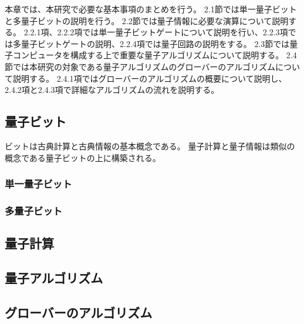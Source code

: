 \begin{comment}
    基本的内容
\end{comment}
本章では、本研究で必要な基本事項のまとめを行う。
2.1節では単一量子ビットと多量子ビットの説明を行う。
2.2節では量子情報に必要な演算について説明する。
2.2.1項、2.2.2項では単一量子ビットゲートについて説明を行い、2.2.3項では多量子ビットゲートの説明、2.2.4項では量子回路の説明をする。
2.3節では量子コンピュータを構成する上で重要な量子アルゴリズムについて説明する。
2.4節では本研究の対象である量子アルゴリズムのグローバーのアルゴリズムについて説明する。
2.4.1項ではグローバーのアルゴリズムの概要について説明し、2.4.2項と2.4.3項で詳細なアルゴリズムの流れを説明する。

\subsection{量子ビット}
ビットは古典計算と古典情報の基本概念である。
量子計算と量子情報は類似の概念である量子ビットの上に構築される。

\subsubsection{単一量子ビット}


\subsubsection{多量子ビット}
% 


\subsection{量子計算}
% 


\subsection{量子アルゴリズム}


\subsection{グローバーのアルゴリズム}
